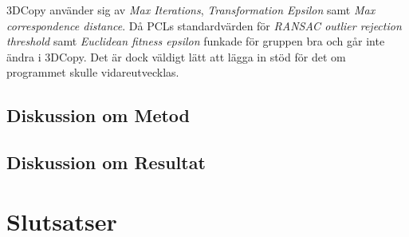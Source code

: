3DCopy använder sig av \textit{Max Iterations}, \textit{Transformation Epsilon} samt \textit{Max correspondence distance}. Då PCLs standardvärden för \textit{RANSAC outlier rejection threshold} samt \textit{Euclidean fitness epsilon} funkade för gruppen bra och går inte ändra i 3DCopy. Det är dock väldigt lätt att lägga in stöd för det om programmet skulle vidareutvecklas.

\subsection{Diskussion om Metod}



\subsection{Diskussion om Resultat}



\section{Slutsatser}
\label{sec:conclusions-karlsson}


